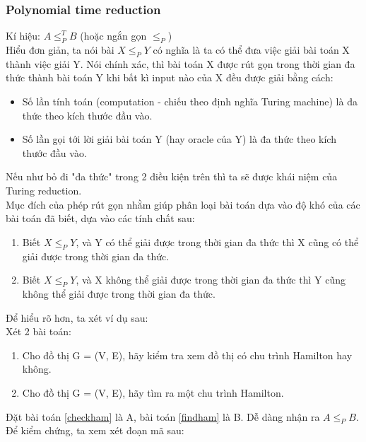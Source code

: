 \documentclass[a4paper 14pt]{article}
\begin{document}
			\subsubsection{Polynomial time reduction}
				Kí hiệu: $A \leq_P^T B$ (hoặc ngắn gọn $\leq_P$)\\
				Hiểu đơn giản, ta nói bài $X \leq_P Y$ có nghĩa là ta có thể đưa việc giải bài toán X thành việc giải Y. Nói chính xác, thì bài toán X được rút gọn trong thời gian đa thức thành bài toán Y khi bất kì input nào của X đều được giải bằng cách:\\
				\begin{itemize}
					\item Số lần tính toán (computation - chiếu theo định nghĩa Turing machine) là đa thức theo kích thước đầu vào.
					\item Số lần gọi tới lời giải bài toán Y (hay oracle của Y) là đa thức theo kích thước đầu vào.
				\end{itemize}
				Nếu như bỏ đi "đa thức" trong 2 điều kiện trên thì ta sẽ được khái niệm của Turing reduction.\\
				Mục đích của phép rút gọn nhằm giúp phân loại bài toán dựa vào độ khó của các bài toán đã biết, dựa vào các tính chất sau:
				\begin{enumerate}
					\item Biết $X \leq_P Y$, và Y có thể giải được trong thời gian đa thức thì X cũng có thể giải được trong thời gian đa thức.
					\item Biết $X \leq_P Y$, và X không thể giải được trong thời gian đa thức thì Y cũng không thể giải được trong thời gian đa thức.
				\end{enumerate}
				Để hiểu rõ hơn, ta xét ví dụ sau:\\
				Xét 2 bài toán:
				\begin{enumerate}
					\item\label{checkham} Cho đồ thị G = (V, E), hãy kiểm tra xem đồ thị có chu trình Hamilton hay không.
					\item\label{findham} Cho đồ thị G = (V, E), hãy tìm ra một chu trình Hamilton.
				\end{enumerate}
				Đặt bài toán \ref{checkham} là A, bài toán \ref{findham} là B. Dễ dàng nhận ra $A \leq_P B$. Để kiểm chứng, ta xem xét đoạn mã sau:
				
\end{document}
